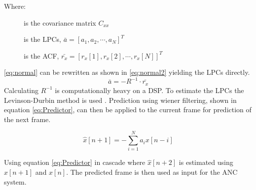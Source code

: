 Where:
\vspace{-8mm} %
\begin{description}
	\item[] is the covariance matrix $C_{xx}$
	\item[] is the LPCs, $\bar{a} = [a_1 , a_2, \cdots, a_N]^T$
	\item[] is the ACF, $\bar{r_x} = [r_x[1] , r_x[2], \cdots, r_x[N]]^T$
\end{description}
\autoref{eq:normal} can be rewritten as shown in \autoref{eq:normal2} yielding the LPCs directly.  
 \begin{equation}\label{eq:normal2}
\bar{a} = -R^{-1}\cdot \bar{r_x}
\end{equation}
Calculating $R^{-1}$ is computationally heavy on a DSP. To estimate the LPCs the Levinson-Durbin method is used \cite{LevinsonDurbin}. Prediction using wiener filtering, shown in equation \ref{eq:Predictor}, can then be applied to the current frame for prediction of the next frame. 

\begin{equation}\label{eq:Predictor}
\hat{x}[n+1] =- \sum^{N}_{i=1}a_ix[n-i]
\end{equation}

Using equation \ref{eq:Predictor} in cascade where $\hat{x}[n+2]$ is estimated using $\hat{x}[n+1]$ and $x[n]$. The predicted frame is then used as input for the ANC system.

